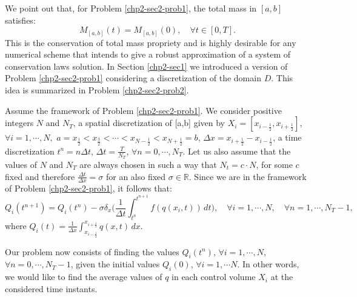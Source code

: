 We point out that, for Problem \ref{chp2-sec2-prob1}, 
the total mass in $[a,b]$ satisfies: 
\begin{equation}
	{M}_{[a,b]}(t) = {M}_{[a,b]}(0), \quad \forall t \in [0,T].
\end{equation}
This is the conservation of total mass propriety and is highly desirable
for any numerical scheme that intends to give a robust approximation of a
system of conservation laws solution.
In Section \ref{chp2-sec1} we introduced a version of Problem \ref{chp2-sec2-prob1}
considering a discretization of the domain $D$. 
This idea is summarized in Problem \ref{chp2-sec2-prob2}.
\begin{prob}
    \label{chp2-sec2-prob2}
		Assume the framework of Problem \ref{chp2-sec2-prob1}.
    We consider positive integers $N$ and $N_T$, a spatial discretization of [a,b] given by
    $X_i = [x_{i-\frac{1}{2}}, x_{i+\frac{1}{2}}]$,$\forall i = 1, \cdots, N,$ 
		$a = x_{\frac{1}{2}} < x_{\frac{3}{2}} < \cdots < x_{N-\frac{1}{2}} < x_{N+\frac{1}{2}} = b$,
		$\Delta x = x_{i+\frac{1}{2}}-x_{i-\frac{1}{2}}$,
		a time discretization
    $t^{n} = n\Delta t$, $\Delta t = \frac{T}{N_T}$, $\forall n = 0, \cdots, N_T$.
     	Let us also assume that the values of $N$ and $N_T$ are always chosen in such a way
    	that $N_t = c \cdot N $, for some $c$ fixed and therefore $\frac{\Delta t}{\Delta x} = \sigma$
    	for an also fixed $\sigma \in \mathbb{R}$.
		Since we are in the framework of Problem \ref{chp2-sec2-prob1}, it follows that:
		\begin{equation}
			\label{1d-fvexact-scheme}
						{Q}_i(t^{n+1}) =  {Q}_i(t^{n}) -
						\sigma \delta _x\bigg( \frac{1}{\Delta t}\int_{t^{n}}^{t^{n+1}}
						{f}({q}(x_{i}, t)) \,dt \bigg),
						\quad \forall i = 1, \cdots, N,
						\quad \forall n = 1, \cdots, N_T-1,
		\end{equation}
		where ${Q}_i(t) = \frac{1}{\Delta x}
		\int_{x_{i-\frac{1}{2}}}^{x_{i+\frac{1}{2}}} {q}(x,t) \,dx$.

		Our problem now consists of finding the values ${Q}_i(t^{n})$, 
		$\forall i = 1, \cdots, N$, $\forall n = 0, \cdots, N_T-1$,
		given the initial values ${Q}_i(0)$, $\forall i = 1, \cdots N$.
		In other words, we would like to find the average values of ${q}$
		in each control volume $X_i$ at the considered time instants.
\end{prob}

